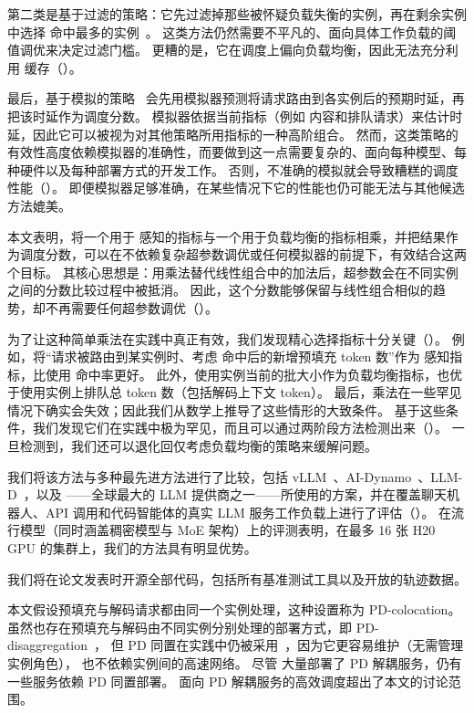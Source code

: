 第二类是基于过滤的策略：它先过滤掉那些被怀疑负载失衡的实例，再在剩余实例中选择 {\kvcache} 命中最多的实例~\cite{aibrix}。
这类方法仍然需要不平凡的、面向具体工作负载的阈值调优来决定过滤门槛。
更糟的是，它在调度上偏向负载均衡，因此无法充分利用 {\kvcache} 缓存（\textsection{\ref{sec:filter-combination}}）。

最后，基于模拟的策略~\cite{305212, llm-d, DBLP:journals/corr/abs-2507-17769, DBLP:journals/corr/abs-2504-08784}
会先用模拟器预测将请求路由到各实例后的预期时延，再把该时延作为调度分数。
模拟器依据当前指标（例如 {\kvcache} 内容和排队请求）来估计时延，因此它可以被视为对其他策略所用指标的一种高阶组合。
然而，这类策略的有效性高度依赖模拟器的准确性，而要做到这一点需要复杂的、面向每种模型、每种硬件以及每种部署方式的开发工作。
否则，不准确的模拟就会导致糟糕的调度性能（\textsection{\ref{sec:prediction-combination}}）。
即便模拟器足够准确，在某些情况下它的性能也仍可能无法与其他候选方法媲美。

本文表明，将一个用于 {\kvcache} 感知的指标与一个用于负载均衡的指标相乘，并把结果作为调度分数，可以在不依赖复杂超参数调优或任何模拟器的前提下，有效结合这两个目标。
其核心思想是：用乘法替代线性组合中的加法后，超参数会在不同实例之间的分数比较过程中被抵消。
因此，这个分数能够保留与线性组合相似的趋势，却不再需要任何超参数调优（\textsection{\ref{sec:method}}）。

为了让这种简单乘法在实践中真正有效，我们发现精心选择指标十分关键（\textsection{\ref{sec:indicators}}）。
例如，将“请求被路由到某实例时、考虑 {\kvcache} 命中后的新增预填充 token 数”作为 {\kvcache} 感知指标，比使用 {\kvcache} 命中率更好。
此外，使用实例当前的批大小作为负载均衡指标，也优于使用实例上排队总 token 数（包括解码上下文 token）。
最后，乘法在一些罕见情况下确实会失效；因此我们从数学上推导了这些情形的大致条件。
基于这些条件，我们发现它们在实践中极为罕见，而且可以通过两阶段方法检测出来（\textsection{\ref{sec:m-analyze}}）。
一旦检测到，我们还可以退化回仅考虑负载均衡的策略来缓解问题。

我们将该方法与多种最先进方法进行了比较，包括 vLLM~\cite{vllm-code}、AI-Dynamo~\cite{ai-Dynamo}、LLM-D~\cite{llm-d}，以及 {\company}——全球最大的 LLM 提供商之一——所使用的方案，并在覆盖聊天机器人、API 调用和代码智能体的真实 LLM 服务工作负载上进行了评估（\textsection{\ref{sec:eval-setup}}）。
在流行模型（同时涵盖稠密模型与 MoE 架构）上的评测表明，在最多 16 张 H20 GPU 的集群上，我们的方法具有明显优势。

我们将在论文发表时开源全部代码，包括所有基准测试工具以及开放的轨迹数据。

本文假设预填充与解码请求都由同一个实例处理，这种设置称为 PD-colocation。
虽然也存在预填充与解码由不同实例分别处理的部署方式，即 PD-disaggregation~\cite{DBLP:conf/isca/PatelCZSGMB24,DBLP:conf/osdi/ZhongLCHZL0024}，
但 PD 同置在实践中仍被采用~\cite{DBLP:conf/sosp/Xiang0QYZYZL0025}，因为它更容易维护（无需管理实例角色），
也不依赖实例间的高速网络。
尽管 {\company} 大量部署了 PD 解耦服务，仍有一些服务依赖 PD 同置部署。
面向 PD 解耦服务的高效调度超出了本文的讨论范围。
